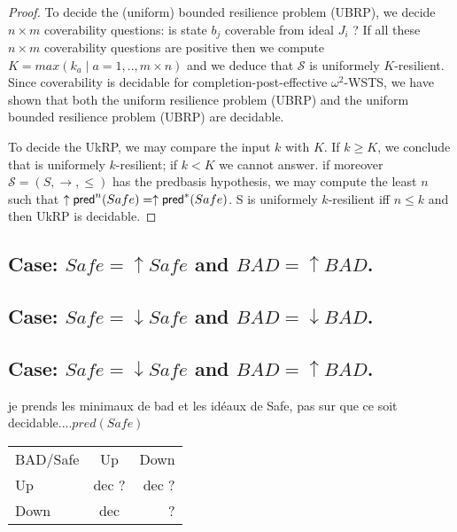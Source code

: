 \begin{proof}
%

To decide the (uniform) bounded resilience problem (UBRP), we decide $n \times m$ coverability questions: is state $b_j$ coverable from ideal $J_i$ ? If all these $n \times m$ coverability questions are positive then we compute $K=max(k_a \mid a=1,..,m \times n)$ and we deduce that  $\mathscr{S}$ is uniformely $K$-resilient. Since coverability is decidable for completion-post-effective $\omega^2$-WSTS, we have shown that both the uniform resilience problem (UBRP) and the uniform bounded resilience problem (UBRP) are decidable.

To decide the UkRP, we may compare the input $k$ with $K$. If $k \geq K$, we conclude that is uniformely $k$-resilient; if $k < K$ we cannot answer. if moreover $\mathscr{S}=(S,\rightarrow, \leq)$ has the predbasis hypothesis, we may compute the least $n$ such that $ \uparrow \textsf{pred}^n(Safe)=  \uparrow \textsf{pred}^*(Safe)$. S is uniformely $k$-resilient iff $n \leq k$ and then UkRP is decidable.
\end{proof}

%

\subsection{Case: $Safe=\uparrow Safe$ and $BAD=\uparrow BAD$.}




\subsection{Case: $Safe=\downarrow Safe$ and $BAD=\downarrow BAD$.}

\subsection{Case: $Safe=\downarrow Safe$ and $BAD=\uparrow BAD$.}
%
%
je prends les minimaux de bad et les idéaux de Safe, pas sur que ce soit decidable....$pred(Safe)$


\begin{tabular}{ l c r }
   BAD/Safe & Up & Down \\
   Up & dec ? & dec ? \\
   Down & dec & ? \\
 \end{tabular}

